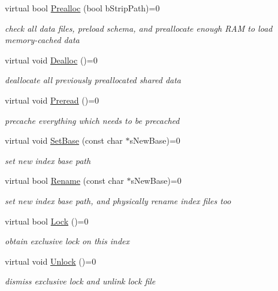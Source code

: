 \begin{DoxyCompactItemize}
virtual bool \hyperlink{classCSphIndex_a5ecebcd36640119821b2a3c44edf120c}{Prealloc} (bool b\-Strip\-Path)=0
\begin{DoxyCompactList}\small\item\em check all data files, preload schema, and preallocate enough R\-A\-M to load memory-\/cached data \end{DoxyCompactList}\item 
virtual void \hyperlink{classCSphIndex_a19cd46e34780cebed5ab7d4b0faed501}{Dealloc} ()=0
\begin{DoxyCompactList}\small\item\em deallocate all previously preallocated shared data \end{DoxyCompactList}\item 
virtual void \hyperlink{classCSphIndex_acaa353c3d9d7753600527336efa6a0f8}{Preread} ()=0
\begin{DoxyCompactList}\small\item\em precache everything which needs to be precached \end{DoxyCompactList}\item 
virtual void \hyperlink{classCSphIndex_a390720d5982aedac1973de92f08fe821}{Set\-Base} (const char $\ast$s\-New\-Base)=0
\begin{DoxyCompactList}\small\item\em set new index base path \end{DoxyCompactList}\item 
virtual bool \hyperlink{classCSphIndex_a8dc7ada3f2ed3d5e946b0b3b744c6ba7}{Rename} (const char $\ast$s\-New\-Base)=0
\begin{DoxyCompactList}\small\item\em set new index base path, and physically rename index files too \end{DoxyCompactList}\item 
virtual bool \hyperlink{classCSphIndex_a0d9cb1bec9432296de727de7982fd28f}{Lock} ()=0
\begin{DoxyCompactList}\small\item\em obtain exclusive lock on this index \end{DoxyCompactList}\item 
virtual void \hyperlink{classCSphIndex_aaabb7c87f3776dc91be0ebb9978ea8d7}{Unlock} ()=0
\begin{DoxyCompactList}\small\item\em dismiss exclusive lock and unlink lock file \end{DoxyCompactList}\item 

\end{DoxyCompactItemize}
